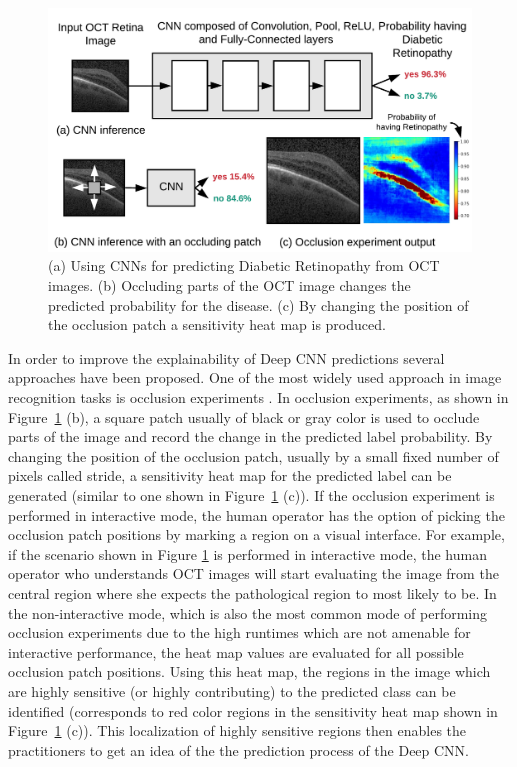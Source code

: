 \begin{figure}[t]
  \includegraphics[width=\columnwidth]{./images/krypton_overview}
  \caption{(a) Using CNNs for predicting Diabetic Retinopathy from OCT images. (b) Occluding parts of the OCT image changes the predicted probability for the disease. (c) By changing the position of the occlusion patch a sensitivity heat map is produced.}
  \label{fig:krypton_overview}
\end{figure}

In order to improve the explainability of Deep CNN predictions several approaches have been proposed.
One of the most widely used approach in image recognition tasks is occlusion experiments \cite{zeiler2014visualizing}.
In occlusion experiments, as shown in Figure~\ref{fig:krypton_overview} (b), a square patch usually of black or gray color is used to occlude parts of the image and record the change in the predicted label probability.
By changing the position of the occlusion patch, usually by a small fixed number of pixels called stride, a sensitivity heat map for the predicted label can be generated (similar to one shown in Figure~\ref{fig:krypton_overview} (c)).
If the occlusion experiment is performed in interactive mode, the human operator has the option of picking the occlusion patch positions by marking a region on a visual interface.
For example, if the scenario shown in Figure \ref{fig:krypton_overview} is performed in interactive mode, the human operator who understands OCT images will start evaluating the image from the central region where she expects the pathological region to most likely to be.
In the non-interactive mode, which is also the most common mode of performing occlusion experiments due to the high runtimes which are not amenable for interactive performance, the heat map values are evaluated for all possible occlusion patch positions.
Using this heat map, the regions in the image which are highly sensitive (or highly contributing) to the predicted class can be identified (corresponds to red color regions in the sensitivity heat map shown in Figure~\ref{fig:krypton_overview} (c)).
This localization of highly sensitive regions then enables the practitioners to get an idea of the the prediction process of the Deep CNN.

